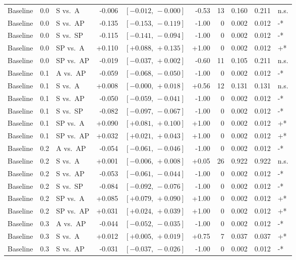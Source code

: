 \begin{landscape}
\begin{scriptsize}
\begin{longtable}{lllrrrrrrl}
Baseline & 0.0 & S vs.\ A & -0.006 & $[-0.012,\,-0.000]$ & -0.53 & 13 & 0.160 & 0.211 & n.s. \\
Baseline & 0.0 & S vs.\ AP & -0.135 & $[-0.153,\,-0.119]$ & -1.00 & 0 & 0.002 & 0.012 & -* \\
Baseline & 0.0 & S vs.\ SP & -0.115 & $[-0.141,\,-0.094]$ & -1.00 & 0 & 0.002 & 0.012 & -* \\
Baseline & 0.0 & SP vs.\ A & +0.110 & $[+0.088,\,+0.135]$ & +1.00 & 0 & 0.002 & 0.012 & +* \\
Baseline & 0.0 & SP vs.\ AP & -0.019 & $[-0.037,\,+0.002]$ & -0.60 & 11 & 0.105 & 0.211 & n.s. \\
Baseline & 0.1 & A vs.\ AP & -0.059 & $[-0.068,\,-0.050]$ & -1.00 & 0 & 0.002 & 0.012 & -* \\
Baseline & 0.1 & S vs.\ A & +0.008 & $[-0.000,\,+0.018]$ & +0.56 & 12 & 0.131 & 0.131 & n.s. \\
Baseline & 0.1 & S vs.\ AP & -0.050 & $[-0.059,\,-0.041]$ & -1.00 & 0 & 0.002 & 0.012 & -* \\
Baseline & 0.1 & S vs.\ SP & -0.082 & $[-0.097,\,-0.067]$ & -1.00 & 0 & 0.002 & 0.012 & -* \\
Baseline & 0.1 & SP vs.\ A & +0.090 & $[+0.081,\,+0.100]$ & +1.00 & 0 & 0.002 & 0.012 & +* \\
Baseline & 0.1 & SP vs.\ AP & +0.032 & $[+0.021,\,+0.043]$ & +1.00 & 0 & 0.002 & 0.012 & +* \\
Baseline & 0.2 & A vs.\ AP & -0.054 & $[-0.061,\,-0.046]$ & -1.00 & 0 & 0.002 & 0.012 & -* \\
Baseline & 0.2 & S vs.\ A & +0.001 & $[-0.006,\,+0.008]$ & +0.05 & 26 & 0.922 & 0.922 & n.s. \\
Baseline & 0.2 & S vs.\ AP & -0.053 & $[-0.061,\,-0.044]$ & -1.00 & 0 & 0.002 & 0.012 & -* \\
Baseline & 0.2 & S vs.\ SP & -0.084 & $[-0.092,\,-0.076]$ & -1.00 & 0 & 0.002 & 0.012 & -* \\
Baseline & 0.2 & SP vs.\ A & +0.085 & $[+0.079,\,+0.090]$ & +1.00 & 0 & 0.002 & 0.012 & +* \\
Baseline & 0.2 & SP vs.\ AP & +0.031 & $[+0.024,\,+0.039]$ & +1.00 & 0 & 0.002 & 0.012 & +* \\
Baseline & 0.3 & A vs.\ AP & -0.044 & $[-0.052,\,-0.035]$ & -1.00 & 0 & 0.002 & 0.012 & -* \\
Baseline & 0.3 & S vs.\ A & +0.012 & $[+0.005,\,+0.019]$ & +0.75 & 7 & 0.037 & 0.037 & +* \\
Baseline & 0.3 & S vs.\ AP & -0.031 & $[-0.037,\,-0.026]$ & -1.00 & 0 & 0.002 & 0.012 & -* \\

\end{longtable}
\end{scriptsize}
\end{landscape}
